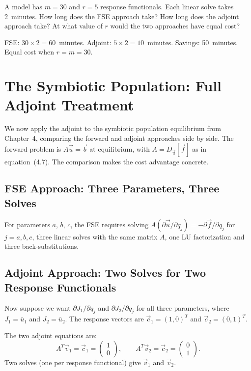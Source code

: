 \begin{selfcheck}
A model has $m = 30$ \POIs and $r = 5$ response functionals.
Each linear solve takes 2~minutes.
How long does the FSE approach take?
How long does the adjoint approach take?
At what value of $r$ would the two approaches have equal cost?
\end{selfcheck}
\begin{scAnswer}
FSE: $30 \times 2 = 60$~minutes.
Adjoint: $5 \times 2 = 10$~minutes. Savings: 50~minutes.
Equal cost when $r = m = 30$.
\end{scAnswer}

\section{The Symbiotic Population: Full Adjoint Treatment}
\label{sec:sympAdj}

We now apply the adjoint to the symbiotic population equilibrium
from Chapter~4, comparing the forward and adjoint approaches
side by side. The forward problem is $A\vec{\bar{u}} = \vec{b}$
at equilibrium, with $A = D_{\vec{u}}[\vec{f}]$ as in
equation~(4.7). The comparison makes the cost advantage concrete.

\subsection{FSE Approach: Three Parameters, Three Solves}

For parameters $a$, $b$, $c$, the FSE requires solving
$A(\partial\vec{\bar{u}}/\partial q_j) = -\partial\vec{f}/\partial q_j$
for $j = a, b, c$, three linear solves with the same matrix $A$,
one LU factorization and three back-substitutions.

\subsection{Adjoint Approach: Two Solves for Two Response Functionals}

Now suppose we want $\partial J_1/\partial q_j$ and
$\partial J_2/\partial q_j$ for all three parameters,
where $J_1 = \bar{u}_1$ and $J_2 = \bar{u}_2$.
The response vectors are $\vec{c}_1 = (1,0)^T$ and
$\vec{c}_2 = (0,1)^T$.

The two adjoint equations are:
\begin{equation}
  A^T\vec{v}_1 = \vec{c}_1 = \begin{pmatrix}1\\0\end{pmatrix},
  \qquad
  A^T\vec{v}_2 = \vec{c}_2 = \begin{pmatrix}0\\1\end{pmatrix}.
  \label{eq:sympAdjEqs}
\end{equation}
Two solves (one per response functional) give $\vec{v}_1$ and $\vec{v}_2$.

